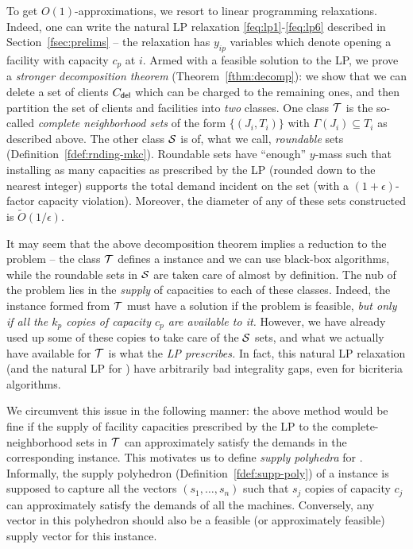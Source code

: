 \medskip {} %
To get $O(1)$-approximations, we resort to linear programming relaxations. Indeed, one can write the natural LP relaxation \eqref{feq:lp1}-\eqref{feq:lp6} described in Section~\ref{fsec:prelims} -- the relaxation has $y_{ip}$ variables which denote opening a
facility with capacity $c_p$ at $i$.
Armed with a feasible solution to the LP, we prove a \emph{stronger decomposition theorem} (Theorem~\ref{fthm:decomp}): we show that we can delete a set of clients $C_{\mathsf{del}}$ which can be charged to the remaining ones, and then partition the set of clients and facilities into {\em two} classes.
One class ${\cal T}$  is the so-called \emph{complete neighborhood sets} of the form $\{(J_i, T_i)\}$ with $\Gamma(J_i) \subseteq T_i$ as described above. The other class ${\cal S}$  is of, what we call, {\em roundable} sets (Definition~\ref{fdef:rnding-mkc}). Roundable sets have ``enough'' $y$-mass such that installing as many  capacities as prescribed by the LP (rounded down to the nearest integer) supports the total demand incident on the set (with a $(1+\epsilon)$-factor capacity violation). Moreover, the diameter of any of these sets constructed is $\tilde{O}(1/\epsilon)$.

\medskip {}
It may seem that the above decomposition theorem implies a reduction to the \cckp problem -- the class ${\cal T}$ defines a \cckp instance and we can use black-box algorithms, while the roundable sets in ${\cal S}$ are taken care of almost by definition. The nub of the problem lies in the {\em supply} of capacities to each of these classes.  Indeed, the \cckp instance formed from ${\cal T}$ must have a solution if the \mckc problem is feasible, {\em but only if all the $k_p$ copies of capacity $c_p$ are available to it.} However, we have already used up some of these copies to take care of the ${\cal S}$ sets, and what we actually have available for ${\cal T}$ is what the {\em LP prescribes.} In fact, this natural LP relaxation (and the natural LP for \cckp) have arbitrarily bad integrality gaps, even for bicriteria algorithms.%

\medskip {} We circumvent this issue in the following manner: the above method would be fine if the supply of facility capacities prescribed by the LP to the complete-neighborhood sets in ${\cal T}$ can approximately satisfy the demands in the corresponding \cckp instance. This motivates us to define {\em supply polyhedra} for \cckp. Informally, the supply polyhedron (Definition~\ref{fdef:supp-poly}) of a \cckp instance is supposed to capture all the vectors $(s_1,\ldots,s_n)$ such that $s_j$ copies of capacity $c_j$ can approximately satisfy the demands of all the machines. Conversely, any vector in this polyhedron should also be a feasible (or approximately feasible) supply vector for this instance.

